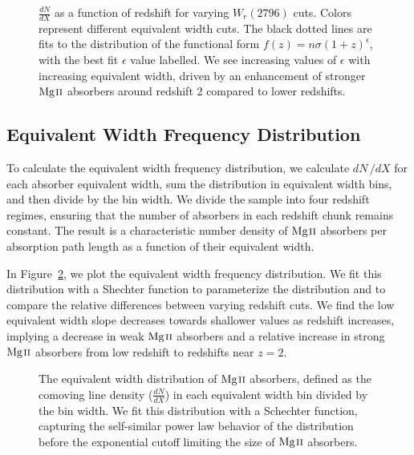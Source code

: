 \documentclass[iop,apj,numberedappendix,appendixfloats,twocolappendix]{emulateapj}
\begin{document}
\begin{figure}[bth]
\caption{$\frac{dN}{dX}$ as a function of redshift for varying $W_r(2796)$ cuts. Colors represent different equivalent width cuts. The black dotted lines are fits to the distribution of the functional form $f(z) = n\sigma (1 + z)^{\epsilon}$, with the best fit $\epsilon$ value labelled. We see increasing values of $\epsilon$ with increasing equivalent width, driven by an enhancement of stronger ${\hbox{{\rm Mg}\kern 0.1em{\sc ii}}}$ absorbers around redshift 2 compared to lower redshifts.}
\label{fig:dndx_cuts}
\end{figure}

\subsection{Equivalent Width Frequency Distribution}
\label{sec:ewdistro}

To calculate the equivalent width frequency distribution, we calculate $dN\,/dX$ for each absorber equivalent width, sum the distribution in equivalent width bins, and then divide by the bin width. We divide the sample into four redshift regimes, ensuring that the number of absorbers in each redshift chunk remains constant. The result is a characteristic number density of ${\hbox{{\rm Mg}\kern 0.1em{\sc ii}}}$ absorbers per absorption path length as a function of their equivalent width.

In Figure~\ref{fig:ewdistro}, we plot the equivalent width frequency distribution. We fit this distribution with a Shechter function to parameterize the distribution and to compare the relative differences between varying redshift cuts. We find the low equivalent width slope decreases towards shallower values as redshift increases, implying a decrease in weak ${\hbox{{\rm Mg}\kern 0.1em{\sc ii}}}$ absorbers and a relative increase in strong ${\hbox{{\rm Mg}\kern 0.1em{\sc ii}}}$ absorbers from low redshift to redshifts near $z = 2$. 

\begin{figure*}[bth]
\caption{The equivalent width distribution of ${\hbox{{\rm Mg}\kern 0.1em{\sc ii}}}$ absorbers, defined as the comoving line density ($\frac{dN}{dX}$) in each equivalent width bin divided by the bin width. We fit this distribution with a Schechter function, capturing the self-similar power law behavior of the distribution before the exponential cutoff limiting the size of ${\hbox{{\rm Mg}\kern 0.1em{\sc ii}}}$ absorbers.}
\label{fig:ewdistro}
\end{figure*}
\end{document}

